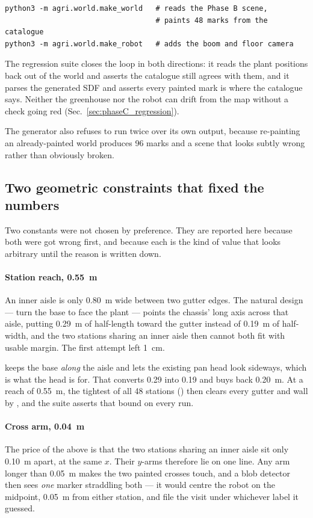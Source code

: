 \begin{lstlisting}[style=bash]
python3 -m agri.world.make_world   # reads the Phase B scene,
                                   # paints 48 marks from the catalogue
python3 -m agri.world.make_robot   # adds the boom and floor camera
\end{lstlisting}

The regression suite closes the loop in both directions: it reads the
plant positions back out of the \phaseB{} world and asserts the
catalogue still agrees with them, and it parses the generated SDF and
asserts every painted mark is where the catalogue says. Neither the
greenhouse nor the robot can drift from the map without a check going
red (Sec.~\ref{sec:phaseC_regression}).

The generator also refuses to run twice over its own output, because
re-painting an already-painted world produces 96 marks and a scene that
looks subtly wrong rather than obviously broken.

\subsection{Two geometric constraints that fixed the numbers}

Two constants were not chosen by preference. They are reported here
because both were got wrong first, and because each is the kind of value
that looks arbitrary until the reason is written down.

\paragraph{Station reach, \SI{0.55}{m}} An inner aisle is only 0.80~m
wide between two gutter edges. The natural design --- turn the base to
face the plant --- points the chassis' long axis across that aisle,
putting 0.29~m of half-length toward the gutter instead of 0.19~m of
half-width, and the two stations sharing an inner aisle then cannot both
fit with usable margin. The first attempt left \SI{1}{cm}.

\phaseC{} keeps the base \emph{along} the aisle and lets the existing
pan head look sideways, which is what the head is for. That converts
0.29 into 0.19 and buys back 0.20~m. At a reach of \SI{0.55}{m}, the
tightest of all 48 stations () then clears every gutter
and wall by , and the suite asserts that bound on
every run.

\paragraph{Cross arm, \SI{0.04}{m}} The price of the above is that the
two stations sharing an inner aisle sit only \SI{0.10}{m} apart, at the
same $x$. Their $y$-arms therefore lie on one line. Any arm longer than
\SI{0.05}{m} makes the two painted crosses touch, and a blob detector
then sees \emph{one} marker straddling both --- it would centre the
robot on the midpoint, \SI{0.05}{m} from either station, and file the
visit under whichever label it guessed.

